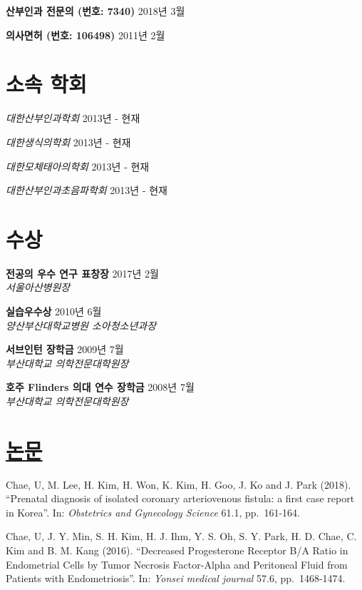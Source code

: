 \documentclass[12pt,]{article}
\begin{document}
\textbf{산부인과 전문의 (번호: 7340)} \hfill 2018년 3월

\textbf{의사면허 (번호: 106498)} \hfill 2011년 2월

\hypertarget{-}{%
\section{소속 학회}\label{-}}

\emph{대한산부인과학회} \hfill 2013년 - 현재

\emph{대한생식의학회} \hfill 2013년 - 현재

\emph{대한모체태아의학회} \hfill 2013년 - 현재

\emph{대한산부인과초음파학회} \hfill 2013년 - 현재

\pagebreak

\section{수상}

\textbf{전공의 우수 연구 표창장} \hfill 2017년 2월\\
\emph{서울아산병원장}

\textbf{실습우수상} \hfill 2010년 6월\\
\emph{양산부산대학교병원 소아청소년과장}

\textbf{서브인턴 장학금} \hfill 2009년 7월\\
\emph{부산대학교 의학전문대학원장}

\textbf{호주 Flinders 의대 연수 장학금} \hfill 2008년 7월\\
\emph{부산대학교 의학전문대학원장}

\section{\texorpdfstring{\href{https://scholar.google.co.kr/citations?user=J2bg_TAAAAAJ\&hl=en}{논문}}{논문}}

Chae, U, M. Lee, H. Kim, H. Won, K. Kim, H. Goo, J. Ko and J. Park
(2018). ``Prenatal diagnosis of isolated coronary arteriovenous fistula:
a first case report in Korea''. In: \emph{Obstetrics and Gynecology
Science} 61.1, pp.~161-164.

Chae, U, J. Y. Min, S. H. Kim, H. J. Ihm, Y. S. Oh, S. Y. Park, H. D.
Chae, C. Kim and B. M. Kang (2016). ``Decreased Progesterone Receptor
B/A Ratio in Endometrial Cells by Tumor Necrosis Factor-Alpha and
Peritoneal Fluid from Patients with Endometriosis''. In: \emph{Yonsei
medical journal} 57.6, pp.~1468-1474.
\end{document}
